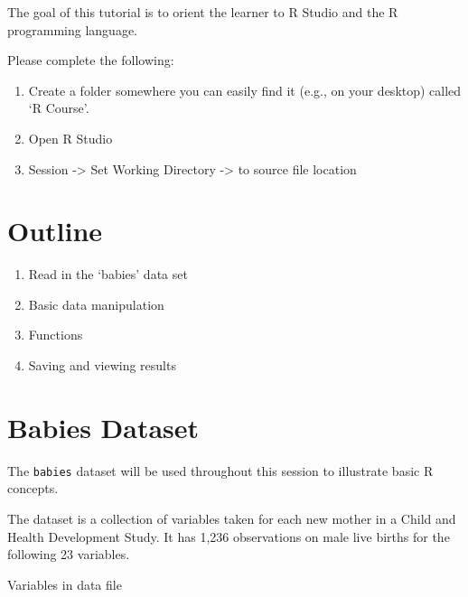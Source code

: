 \documentclass[
]{book}
\providecommand{\tightlist}{%
  \setlength{\itemsep}{0pt}\setlength{\parskip}{0pt}}
\begin{document}
The goal of this tutorial is to orient the learner to R Studio and the R programming language.

Please complete the following:

\begin{enumerate}
\def\labelenumi{\arabic{enumi}.}
\tightlist
\item
  Create a folder somewhere you can easily find it (e.g., on your desktop) called `R Course'.
\item
  Open R Studio
\item
  Session -\textgreater{} Set Working Directory -\textgreater{} to source file location
\end{enumerate}

\hypertarget{outline}{%
\section*{Outline}\label{outline}}

\begin{enumerate}
\def\labelenumi{\arabic{enumi}.}
\tightlist
\item
  Read in the `babies' data set
\item
  Basic data manipulation
\item
  Functions
\item
  Saving and viewing results
\end{enumerate}

\hypertarget{babies-dataset}{%
\section*{Babies Dataset}\label{babies-dataset}}

The \texttt{babies} dataset will be used throughout this session to illustrate basic R concepts.

The dataset is a collection of variables taken for each new mother in a Child and Health Development Study. It has 1,236 observations on male live births for the following 23 variables.

Variables in data file
\end{document}
